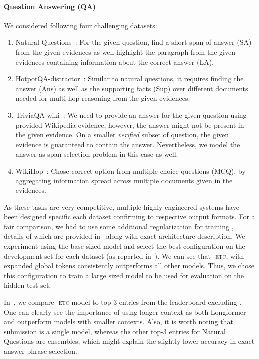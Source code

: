 \paragraph{Question Answering (QA)} 
We considered following four challenging datasets:
\vspace{-1mm}
\begin{enumerate}[leftmargin=6mm, itemsep=2mm, partopsep=0pt,parsep=0pt]
\item  Natural Questions~\citep{kwiatkowski2019natural}: 
For the given question, find a short span of answer (SA) from the given evidences as well highlight the paragraph from the given evidences 
containing information about the correct answer (LA).
\item HotpotQA-distractor~\citep{yang2018hotpotqa}: Similar to natural questions, it requires finding the answer (Ans) as well as the supporting facts (Sup) over different documents needed for multi-hop reasoning from the given evidences. 
\item TriviaQA-wiki~\citep{JoshiTriviaQA2017}: We need to provide an answer for the given question using provided Wikipedia evidence, however, the answer might not be present in the given evidence. On a smaller \emph{verified} subset of question, the given evidence is guaranteed to contain the answer. Nevertheless, we model the answer as span selection problem in this case as well.
\item  WikiHop~\citep{welbl2018constructing}: Chose correct option from multiple-choice questions (MCQ), by aggregating information spread across multiple documents given in the evidences.
\end{enumerate}
As these tasks are very competitive, multiple highly engineered systems have been designed specific each dataset confirming to respective output formats.
For a fair comparison, we had to use some additional regularization for training \bigb, details of which are provided in~ along with exact architecture description.
We experiment using the base sized model and select the best configuration on the development set for each dataset (as reported in~).
We can see that \bigb-\textsc{etc}, with expanded global tokens consistently outperforms all other models.
Thus, we chose this configuration to train a large sized model to be used for evaluation on the hidden test set.

In~, we compare \bigb-\textsc{etc} model to top-3 entries from the leaderboard excluding \bigb. 
One can clearly see the importance of using longer context as both Longformer and \bigb outperform models with smaller contexts.
Also, it is worth noting that \bigb submission is a single model, whereas the other top-3 entries for Natural Questions are  ensembles, which might explain the slightly lower accuracy in exact answer phrase selection.


